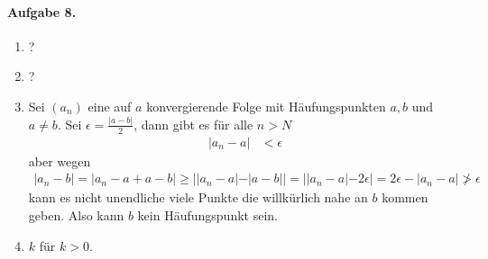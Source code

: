 \documentclass{article}
\begin{document}
\paragraph*{Aufgabe 8.}
\begin{enumerate}
    \item ?

    \item ?

    \item Sei $(a_n)$ eine auf $a$ konvergierende Folge mit Häufungspunkten $a, b$ und $a \neq b$. Sei $\epsilon = \frac{|a - b|}{2}$, dann gibt es für alle $n > N$
    \begin{align*}
        |a_n - a| &< \epsilon
    \end{align*}
    aber wegen
    \begin{align*}
        |a_n - b| = |a_n - a + a - b| \geq ||a_n - a| - |a - b|| = ||a_n - a| - 2\epsilon| = 2\epsilon - |a_n - a| \not> \epsilon
    \end{align*}
    kann es nicht unendliche viele Punkte die willkürlich nahe an $b$ kommen geben. Also kann $b$ kein Häufungspunkt sein.

    \item $k$ für $k > 0$.
\end{enumerate}
\end{document}
